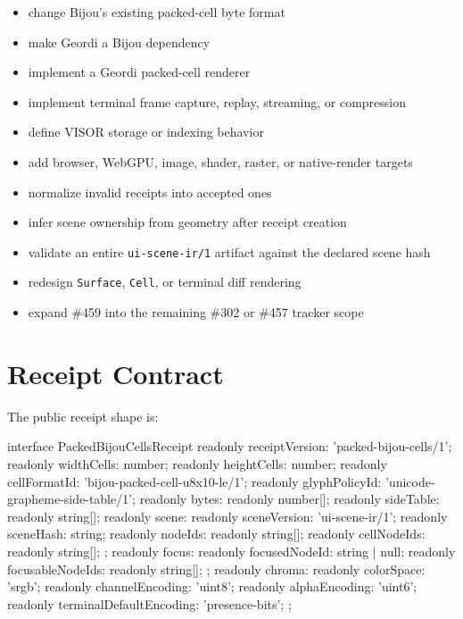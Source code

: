 \begin{itemize}
\tightlist
\item
  change Bijou's existing packed-cell byte format
\item
  make Geordi a Bijou dependency
\item
  implement a Geordi packed-cell renderer
\item
  implement terminal frame capture, replay, streaming, or compression
\item
  define VISOR storage or indexing behavior
\item
  add browser, WebGPU, image, shader, raster, or native-render targets
\item
  normalize invalid receipts into accepted ones
\item
  infer scene ownership from geometry after receipt creation
\item
  validate an entire \texttt{u\allowbreak{}i\allowbreak{}-\allowbreak{}s\allowbreak{}c\allowbreak{}e\allowbreak{}n\allowbreak{}e\allowbreak{}-\allowbreak{}i\allowbreak{}r\allowbreak{}/\allowbreak{}1} artifact against the declared scene hash
\item
  redesign \texttt{S\allowbreak{}u\allowbreak{}r\allowbreak{}f\allowbreak{}a\allowbreak{}c\allowbreak{}e}, \texttt{C\allowbreak{}e\allowbreak{}l\allowbreak{}l}, or terminal diff rendering
\item
  expand \#459 into the remaining \#302 or \#457 tracker scope
\end{itemize}

\section{Receipt Contract}\label{record-164-receipt-contract}

The public receipt shape is:

\begin{CodeBlock}
interface PackedBijouCellsReceipt {
  readonly receiptVersion: 'packed-bijou-cells/1';
  readonly widthCells: number;
  readonly heightCells: number;
  readonly cellFormatId: 'bijou-packed-cell-u8x10-le/1';
  readonly glyphPolicyId: 'unicode-grapheme-side-table/1';
  readonly bytes: readonly number[];
  readonly sideTable: readonly string[];
  readonly scene: {
    readonly sceneVersion: 'ui-scene-ir/1';
    readonly sceneHash: string;
    readonly nodeIds: readonly string[];
    readonly cellNodeIds: readonly string[];
  };
  readonly focus: {
    readonly focusedNodeId: string | null;
    readonly focusableNodeIds: readonly string[];
  };
  readonly chroma: {
    readonly colorSpace: 'srgb';
    readonly channelEncoding: 'uint8';
    readonly alphaEncoding: 'uint6';
    readonly terminalDefaultEncoding: 'presence-bits';
  };
}
\end{CodeBlock}

